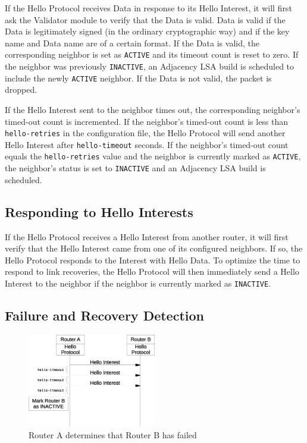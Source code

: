 If the Hello Protocol receives Data in response to its Hello Interest, it will first ask the Validator module to verify that the Data is valid. Data is valid if the Data is legitimately signed (in the ordinary cryptographic way) and if the key name and Data name are of a certain format.
If the Data is valid, the corresponding neighbor is set as \texttt{ACTIVE} and its timeout count is reset to zero.
If the neighbor was previously \texttt{INACTIVE}, an Adjacency LSA build is scheduled to include the newly \texttt{ACTIVE} neighbor.
If the Data is not valid, the packet is dropped.

If the Hello Interest sent to the neighbor times out, the corresponding neighbor's timed-out count is incremented.
If the neighbor's timed-out count is less than \texttt{hello-retries} in the configuration file, the Hello Protocol will send another Hello Interest after \texttt{hello-timeout} seconds.
If the neighbor's timed-out count equals the \texttt{hello-retries} value and the neighbor is currently marked as \texttt{ACTIVE}, the neighbor's status is set to \texttt{INACTIVE} and an Adjacency LSA build is scheduled.

\subsection{Responding to Hello Interests}
\label{sec:respond-to-hello}

If the Hello Protocol receives a Hello Interest from another router, it will first verify that the Hello Interest came from one of its configured neighbors.
If so, the Hello Protocol responds to the Interest with Hello Data.
To optimize the time to respond to link recoveries, the Hello Protocol will then immediately send a Hello Interest to the neighbor if the neighbor is currently marked as \texttt{INACTIVE}.

\subsection{Failure and Recovery Detection}
\label{sec:link-failure}

\begin{figure}
\center
\includegraphics[width=0.5\textwidth]{figures/hello-protocol-timeout}
\caption{Router A determines that Router B has failed}
\end{figure}

